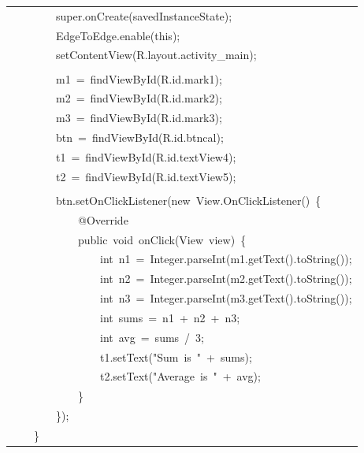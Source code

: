 \documentclass[a4paper,12pt]{article}
\begin{document}
\begin{longtable}{|p{}|}
{\ttfamily\small \ \ \ \ \ \ \ \ super.onCreate(savedInstanceState);} \\
{\ttfamily\small \ \ \ \ \ \ \ \ EdgeToEdge.enable(this);} \\
{\ttfamily\small \ \ \ \ \ \ \ \ setContentView(R.layout.activity\_main);} \\
\strut \\
{\ttfamily\small \ \ \ \ \ \ \ \ m1\ =\ findViewById(R.id.mark1);} \\
{\ttfamily\small \ \ \ \ \ \ \ \ m2\ =\ findViewById(R.id.mark2);} \\
{\ttfamily\small \ \ \ \ \ \ \ \ m3\ =\ findViewById(R.id.mark3);} \\
{\ttfamily\small \ \ \ \ \ \ \ \ btn\ =\ findViewById(R.id.btncal);} \\
{\ttfamily\small \ \ \ \ \ \ \ \ t1\ =\ findViewById(R.id.textView4);} \\
{\ttfamily\small \ \ \ \ \ \ \ \ t2\ =\ findViewById(R.id.textView5);} \\
\strut \\
{\ttfamily\small \ \ \ \ \ \ \ \ btn.setOnClickListener(new\ View.OnClickListener()\ \{} \\
{\ttfamily\small \ \ \ \ \ \ \ \ \ \ \ \ @Override} \\
{\ttfamily\small \ \ \ \ \ \ \ \ \ \ \ \ public\ void\ onClick(View\ view)\ \{} \\
{\ttfamily\small \ \ \ \ \ \ \ \ \ \ \ \ \ \ \ \ int\ n1\ =\ Integer.parseInt(m1.getText().toString());} \\
{\ttfamily\small \ \ \ \ \ \ \ \ \ \ \ \ \ \ \ \ int\ n2\ =\ Integer.parseInt(m2.getText().toString());} \\
{\ttfamily\small \ \ \ \ \ \ \ \ \ \ \ \ \ \ \ \ int\ n3\ =\ Integer.parseInt(m3.getText().toString());} \\
{\ttfamily\small \ \ \ \ \ \ \ \ \ \ \ \ \ \ \ \ int\ sums\ =\ n1\ +\ n2\ +\ n3;} \\
{\ttfamily\small \ \ \ \ \ \ \ \ \ \ \ \ \ \ \ \ int\ avg\ =\ sums\ /\ 3;} \\
{\ttfamily\small \ \ \ \ \ \ \ \ \ \ \ \ \ \ \ \ t1.setText("Sum\ is\ "\ +\ sums);} \\
{\ttfamily\small \ \ \ \ \ \ \ \ \ \ \ \ \ \ \ \ t2.setText("Average\ is\ "\ +\ avg);} \\
{\ttfamily\small \ \ \ \ \ \ \ \ \ \ \ \ \}} \\
{\ttfamily\small \ \ \ \ \ \ \ \ \});} \\
{\ttfamily\small \ \ \ \ \}} \\

\end{longtable}
\end{document}
